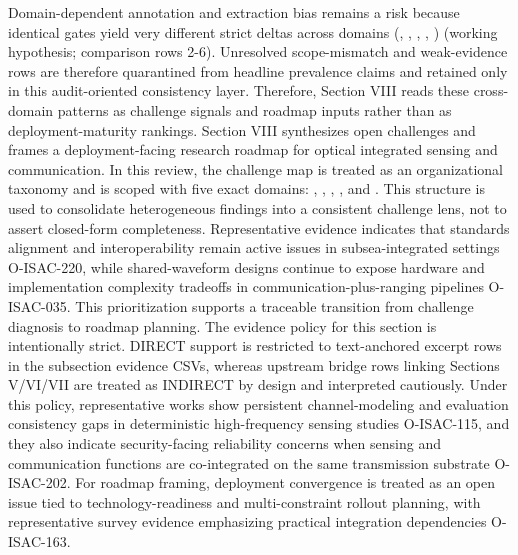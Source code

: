 \markdownRendererUlItem Domain-dependent annotation and extraction bias remains a risk because identical gates yield very different strict deltas across domains (, , , , ) (working hypothesis; comparison rows \markdownRendererHash{}2-\markdownRendererHash{}6).\markdownRendererUlItemEnd 
\markdownRendererUlItem Unresolved scope-mismatch and weak-evidence rows are therefore quarantined from headline prevalence claims and retained only in this audit-oriented consistency layer.\markdownRendererUlItemEnd 
\markdownRendererUlEndTight \markdownRendererInterblockSeparator
{}Therefore, Section VIII reads these cross-domain patterns as challenge signals and roadmap inputs rather than as deployment-maturity rankings.\markdownRendererInterblockSeparator
{}
\markdownRendererSectionEnd 
\markdownRendererSectionEnd 
\markdownRendererSectionEnd 
\markdownRendererSectionEnd \markdownRendererSectionBegin
{}\markdownRendererInterblockSeparator
{}Section VIII synthesizes open challenges and frames a deployment-facing research roadmap for optical integrated sensing and communication. In this review, the challenge map is treated as an organizational taxonomy and is scoped with five exact domains: , , , , and . This structure is used to consolidate heterogeneous findings into a consistent challenge lens, not to assert closed-form completeness. Representative evidence indicates that standards alignment and interoperability remain active issues in subsea-integrated settings O-ISAC-220, while shared-waveform designs continue to expose hardware and implementation complexity tradeoffs in communication-plus-ranging pipelines O-ISAC-035. This prioritization supports a traceable transition from challenge diagnosis to roadmap planning.\markdownRendererParagraphSeparator
{}The evidence policy for this section is intentionally strict. DIRECT support is restricted to text-anchored excerpt rows in the subsection evidence CSVs, whereas upstream bridge rows linking Sections V/VI/VII are treated as INDIRECT by design and interpreted cautiously. Under this policy, representative works show persistent channel-modeling and evaluation consistency gaps in deterministic high-frequency sensing studies O-ISAC-115, and they also indicate security-facing reliability concerns when sensing and communication functions are co-integrated on the same transmission substrate O-ISAC-202. For roadmap framing, deployment convergence is treated as an open issue tied to technology-readiness and multi-constraint rollout planning, with representative survey evidence emphasizing practical integration dependencies O-ISAC-163.\markdownRendererParagraphSeparator
